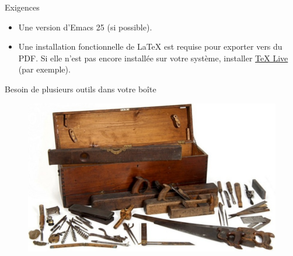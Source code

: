 \documentclass[t]{beamer}
\begin{document}
\begin{frame}[label={sec:org50e840d}]{Exigences}
\begin{itemize}
\item Une version d'Emacs 25 (si possible).

\item Une installation fonctionnelle de \LaTeX{} est requise pour exporter vers du
PDF. Si elle n'est pas encore installée sur votre système, installer \href{http://www.tug.org/texlive/}{\TeX{} Live}
(par exemple).
\end{itemize}
\end{frame}

\begin{frame}[label={sec:orgbcad40e}]{Besoin de plusieurs outils dans votre boîte}
\begin{figure}[!htbp]
\centering
\includegraphics[width=.75\linewidth]{images/toolbox-messy.png}
\end{figure}
\end{frame}
\end{document}

